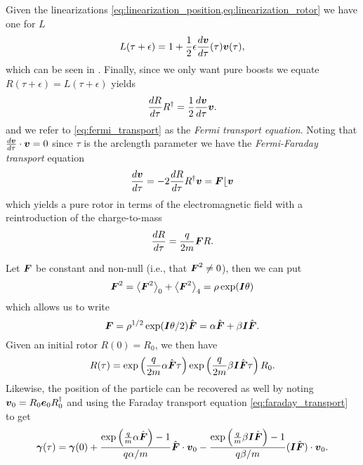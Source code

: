 \documentclass[conf]{new-aiaa}
\begin{document}
Given the linearizations \cref{eq:linearization_position,eq:linearization_rotor} we have one for $L$
\begin{equation}
    L(\tau+\epsilon) = 1+ \frac{1}{2}\epsilon \frac{d \blade{v}}{d\tau}(\tau) {\blade{v}}(\tau),
\end{equation}
which can be seen in \cite{doran_geometric_2003}. Finally, since we only want pure boosts we equate $R(\tau+\epsilon)=L(\tau+\epsilon)$ yields 
\begin{equation}
    \label{eq:fermi_transport}
    \frac{dR}{d\tau} R^\dagger = \frac{1}{2}\frac{d{\blade{v}}}{d\tau}{\blade{v}}.
\end{equation}
and we refer to \cref{eq:fermi_transport} as the \emph{Fermi transport equation}. Noting that $\frac{d\blade{v}}{d\tau}\cdot \blade{v}=0$ since $\tau$ is the arclength parameter we have the \emph{Fermi-Faraday transport} equation
\begin{equation}
\frac{d\blade{v}}{d\tau} = -2 \frac{dR}{d \tau} R^\dagger \blade{v}=\blade{F}\lfloor \blade{v}
\end{equation}
which yields a pure rotor in terms of the electromagnetic field with a reintroduction of the charge-to-mass
\begin{equation}
     \label{eq:fermi_transport_rotor}   
    \frac{dR}{d\tau} = \frac{q}{2m} \blade{F}R.
\end{equation}

\begin{example}
\label{ex:particle_constant_field}
Let $\blade{F}$ be constant and non-null (i.e., that $\blade{F}^2\neq 0$), then we can put
\begin{equation}
\blade{F}^2 = \proj{0}{\blade{F}^2}+\proj{4}{\blade{F}^2}=\rho \exp(\blade{I}\theta)
\end{equation}
which allows us to write 
\begin{equation}
\blade{F}=\rho^{1/2}\exp(\blade{I}\theta/2)\hat{\blade{F}}=\alpha \hat{\blade{F}}+\beta\blade{I} \hat{\blade{F}}.
\end{equation}
Given an initial rotor $R(0)=R_0$, we then have
\begin{equation}
R(\tau)=\exp\left(\frac{q}{2m}\alpha \hat{\blade{F}}\tau\right)\exp\left(\frac{q}{2m}\beta\blade{I}\hat{\blade{F}}\tau\right)R_0.
\end{equation}
Likewise, the position of the particle can be recovered as well by noting $\blade{v}_0=R_0\blade{e}_0 R_0^\dagger$ and using the Faraday transport equation \cref{eq:faraday_transport} to get
\begin{equation}
\blade{\gamma}(\tau) = \blade{\gamma}(0)+\frac{\exp\left(\frac{q}{m}\alpha \hat{\blade{F}}\right)-1}{q\alpha/m} \hat{\blade{F}}\cdot \blade{v}_0 - \frac{\exp\left(\frac{q}{m}\beta \blade{I}\hat{\blade{F}}\right)-1}{q\beta/m}(\blade{I}\hat{\blade{F}})\cdot \blade{v}_0.
\end{equation}
\end{example}
\end{document}
